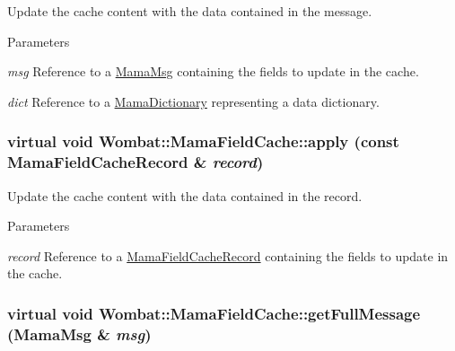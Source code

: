 Update the cache content with the data contained in the message. 
\begin{DoxyParams}{Parameters}
\item[{\em msg}]Reference to a {\ttfamily \hyperlink{classWombat_1_1MamaMsg}{MamaMsg}} containing the fields to update in the cache. \item[{\em dict}]Reference to a {\ttfamily \hyperlink{classWombat_1_1MamaDictionary}{MamaDictionary}} representing a data dictionary. \end{DoxyParams}
\hypertarget{classWombat_1_1MamaFieldCache_ae90c2df69a7629f36b5a6b142987d1aa}{
\subsubsection[{apply}]{\setlength{\rightskip}{0pt plus 5cm}virtual void Wombat::MamaFieldCache::apply (const {\bf MamaFieldCacheRecord} \& {\em record})}}
\label{classWombat_1_1MamaFieldCache_ae90c2df69a7629f36b5a6b142987d1aa}


Update the cache content with the data contained in the record. 
\begin{DoxyParams}{Parameters}
\item[{\em record}]Reference to a {\ttfamily \hyperlink{classWombat_1_1MamaFieldCacheRecord}{MamaFieldCacheRecord}} containing the fields to update in the cache. \end{DoxyParams}
\hypertarget{classWombat_1_1MamaFieldCache_a4a68b6218d7c68b514c15199d05c0abc}{
\subsubsection[{getFullMessage}]{\setlength{\rightskip}{0pt plus 5cm}virtual void Wombat::MamaFieldCache::getFullMessage ({\bf MamaMsg} \& {\em msg})}}
\label{classWombat_1_1MamaFieldCache_a4a68b6218d7c68b514c15199d05c0abc}


